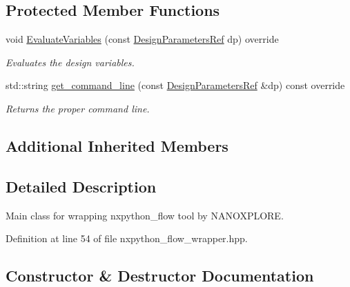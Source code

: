 \subsection*{Protected Member Functions}
\begin{DoxyCompactItemize}
\item 
void \hyperlink{classnxpython__flow__wrapper_a25d952c9a75e7ecd453fc0334625b312}{Evaluate\+Variables} (const \hyperlink{DesignParameters_8hpp_ae36bb1c4c9150d0eeecfe1f96f42d157}{Design\+Parameters\+Ref} dp) override
\begin{DoxyCompactList}\small\item\em Evaluates the design variables. \end{DoxyCompactList}\item 
std\+::string \hyperlink{classnxpython__flow__wrapper_ad88b053a2d5f727075d1e8dc2d574863}{get\+\_\+command\+\_\+line} (const \hyperlink{DesignParameters_8hpp_ae36bb1c4c9150d0eeecfe1f96f42d157}{Design\+Parameters\+Ref} \&dp) const override
\begin{DoxyCompactList}\small\item\em Returns the proper command line. \end{DoxyCompactList}\end{DoxyCompactItemize}
\subsection*{Additional Inherited Members}


\subsection{Detailed Description}
Main class for wrapping nxpython\+\_\+flow tool by N\+A\+N\+O\+X\+P\+L\+O\+RE. 

Definition at line 54 of file nxpython\+\_\+flow\+\_\+wrapper.\+hpp.



\subsection{Constructor \& Destructor Documentation}
\mbox{\label{classnxpython__flow__wrapper_ac5dd3f918706d2613c4380a9504ecb63}} 

